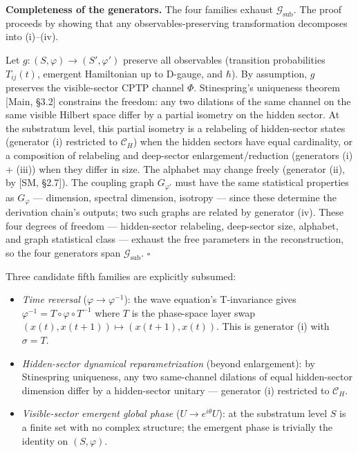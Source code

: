 \documentclass[
]{article}
\providecommand{\tightlist}{%
  \setlength{\itemsep}{0pt}\setlength{\parskip}{0pt}}
\begin{document}
\textbf{Completeness of the generators.} The four families exhaust
\(\mathcal{G}_{\text{sub}}\). The proof proceeds by showing that any
observables-preserving transformation decomposes into (i)--(iv).

Let \(g: (S, \varphi) \to (S', \varphi')\) preserve all observables
(transition probabilities \(T_{ij}(t)\), emergent Hamiltonian up to
D-gauge, and \(\hbar\)). By assumption, \(g\) preserves the
visible-sector CPTP channel \(\Phi\). Stinespring's uniqueness theorem
{[}Main, §3.2{]} constrains the freedom: any two dilations of the same
channel on the same visible Hilbert space differ by a partial isometry
on the hidden sector. At the substratum level, this partial isometry is
a relabeling of hidden-sector states (generator (i) restricted to
\(\mathcal{C}_H\)) when the hidden sectors have equal cardinality, or a
composition of relabeling and deep-sector enlargement/reduction
(generators (i) + (iii)) when they differ in size. The alphabet may
change freely (generator (ii), by {[}SM, §2.7{]}). The coupling graph
\(G_{\varphi'}\) must have the same statistical properties as
\(G_\varphi\) --- dimension, spectral dimension, isotropy --- since
these determine the derivation chain's outputs; two such graphs are
related by generator (iv). These four degrees of freedom ---
hidden-sector relabeling, deep-sector size, alphabet, and graph
statistical class --- exhaust the free parameters in the reconstruction,
so the four generators span \(\mathcal{G}_{\text{sub}}\). \(\square\)

Three candidate fifth families are explicitly subsumed:

\begin{itemize}
\tightlist
\item
  \emph{Time reversal} (\(\varphi \to \varphi^{-1}\)): the wave
  equation's T-invariance gives
  \(\varphi^{-1} = T \circ \varphi \circ T^{-1}\) where \(T\) is the
  phase-space layer swap \((x(t), x(t+1)) \mapsto (x(t+1), x(t))\). This
  is generator (i) with \(\sigma = T\).
\item
  \emph{Hidden-sector dynamical reparametrization} (beyond enlargement):
  by Stinespring uniqueness, any two same-channel dilations of equal
  hidden-sector dimension differ by a hidden-sector unitary ---
  generator (i) restricted to \(\mathcal{C}_H\).
\item
  \emph{Visible-sector emergent global phase} (\(U \to e^{i\theta}U\)):
  at the substratum level \(S\) is a finite set with no complex
  structure; the emergent phase is trivially the identity on
  \((S, \varphi)\).
\end{itemize}
\end{document}
